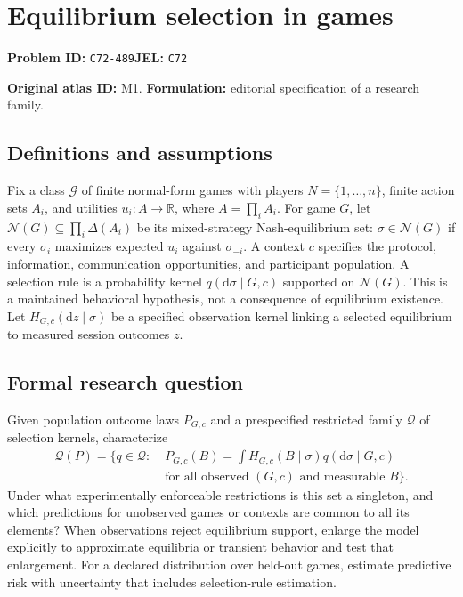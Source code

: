 \documentclass[11pt,a4paper]{article}
\begin{document}
\section*{Equilibrium selection in games}
\textbf{Problem ID:} \texttt{C72-489}\quad \textbf{JEL:} \texttt{C72}\par
\label{problem:OP-0001}
\label{atlas:prob:M1}

\noindent\textbf{Original atlas ID:} M1. \textbf{Formulation:} editorial specification of a research family.

\subsection*{Definitions and assumptions}

Fix a class $\mathcal G$ of finite normal-form games with players $N=\{1,\ldots,n\}$, finite action sets $A_i$, and utilities $u_i:A\to\mathbb R$, where $A=\prod_iA_i$. For game $G$, let $\mathcal N(G)\subseteq\prod_i\Delta(A_i)$ be its mixed-strategy Nash-equilibrium set: $\sigma\in\mathcal N(G)$ if every $\sigma_i$ maximizes expected $u_i$ against $\sigma_{-i}$. A context $c$ specifies the protocol, information, communication opportunities, and participant population. A selection rule is a probability kernel $q(\mathrm d\sigma\mid G,c)$ supported on $\mathcal N(G)$. This is a maintained behavioral hypothesis, not a consequence of equilibrium existence. Let $H_{G,c}(\mathrm dz\mid\sigma)$ be a specified observation kernel linking a selected equilibrium to measured session outcomes $z$.

\subsection*{Formal research question}

Given population outcome laws $P_{G,c}$ and a prespecified restricted family $\mathcal Q$ of selection kernels, characterize
\[
\begin{aligned}
\mathcal Q(P)=\bigl\{q\in\mathcal Q:\;&
 P_{G,c}(B)=\int H_{G,c}(B\mid\sigma)q(\mathrm d\sigma\mid G,c)\\
 &\text{for all observed }(G,c)\text{ and measurable }B\bigr\}.
\end{aligned}
\]
Under what experimentally enforceable restrictions is this set a singleton, and which predictions for unobserved games or contexts are common to all its elements? When observations reject equilibrium support, enlarge the model explicitly to approximate equilibria or transient behavior and test that enlargement. For a declared distribution over held-out games, estimate predictive risk with uncertainty that includes selection-rule estimation.
\end{document}
